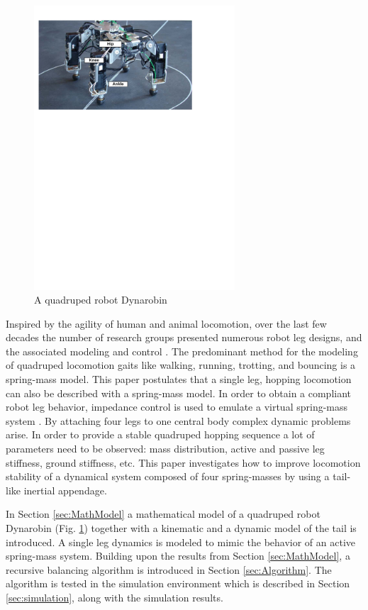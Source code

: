 \begin{figure}
                \centering
                \includegraphics[width=75mm]{./pictures/Dynarobin_introduction_image.pdf}
                \caption{A quadruped robot Dynarobin \cite{DBLP:conf/IEEEcca/MutkaPRK12}}
                \label{fig:Dynarobin}
\end{figure}
 
Inspired by the agility of human and animal locomotion, over the last few decades the number of research groups presented numerous robot leg designs, and the associated modeling and control \cite{CambridgeJournals:1345088}. The predominant method for the modeling of quadruped locomotion gaits like walking, running, trotting, and bouncing is a spring-mass model\cite{Blickhan01}. This paper postulates that a single leg, hopping locomotion can also be described with a spring-mass model. In order to obtain a compliant robot leg behavior, impedance control is used to emulate a virtual spring-mass system \cite{Havoutis01}. By attaching four legs to one central body complex dynamic problems arise. In order to provide a stable quadruped hopping sequence a lot of parameters need to be observed: mass distribution, active and passive leg stiffness, ground stiffness, etc. This paper investigates how to improve locomotion stability of a dynamical system composed of four spring-masses by using a tail-like inertial appendage.
 
In Section \ref{sec:MathModel} a mathematical model of a quadruped robot Dynarobin (Fig. \ref{fig:Dynarobin}) together with a kinematic and a dynamic model of the tail is introduced. A single leg dynamics is modeled to mimic the behavior of an active spring-mass system. Building upon the results from Section \ref{sec:MathModel}, a recursive balancing algorithm is introduced in Section \ref{sec:Algorithm}. The algorithm is tested in the simulation environment which is described in Section \ref{sec:simulation}, along with the simulation results.





